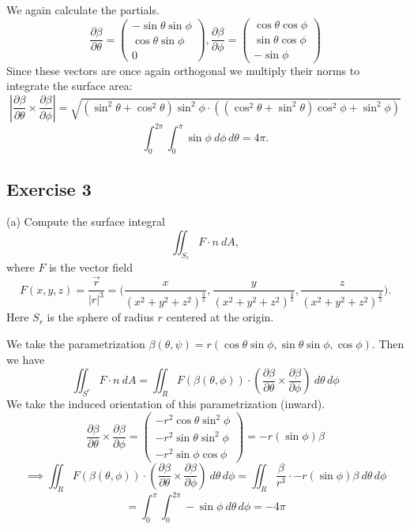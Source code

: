 \documentclass{amsart}
\begin{document}
\medskip \noindent We again calculate the partials.
\[\frac{\partial\beta}{\partial\theta}=\begin{pmatrix}
    -\sin\theta\sin\phi\\
    \cos\theta\sin\phi\\
    0
\end{pmatrix}, \frac{\partial\beta}{\partial\phi}=\begin{pmatrix}
    \cos\theta\cos\phi\\
    \sin\theta\cos\phi\\
    -\sin\phi
\end{pmatrix}\]
Since these vectors are once again orthogonal we multiply their norms to integrate the surface area:
\[\left|\frac{\partial\beta}{\partial\theta}\times \frac{\partial\beta}{\partial\phi}\right|=\sqrt{(\sin^2\theta+\cos^2\theta)
\sin^2\phi\cdot((\cos^2\theta+\sin^2\theta)\cos^2\phi+\sin^2\phi)}\]
\[\int_0^{2\pi}\int_0^{\pi}\sin\phi\:d\phi\,d\theta=4\pi.\]

\bigskip

\subsection*{Exercise 3} (a) Compute the surface integral \[\iint_{S_r}F\cdot n\:dA,\] where $F$ is the vector field
\begin{equation*}
F(x,y,z)=\frac{\vec{r}}{|r|^3}=\bigg(\frac{x}{(x^2+y^2+z^2)^\frac{3}{2}},\frac{y}{(x^2+y^2+z^2)^\frac{3}{2}},\frac{z}{(x^2+y^2+z^2)^\frac{3}{2}}\bigg).
\end{equation*}
Here $S_r$ is the sphere of radius $r$ centered at the origin.

\medskip \noindent We take the parametrization $\beta(\theta, \psi)=r(\cos\theta\sin\phi,\sin\theta\sin\phi,\cos\phi)$. Then we have
\[\iint_{S^r}F\cdot n\:dA=\iint_{R}F(\beta(\theta,\phi))\cdot\left(\frac{\partial\beta}{\partial\theta}\times\frac{\partial\beta}{\partial\phi}\right)\:d\theta\,d\phi\]
We take the induced orientation of this parametrization (inward). 
\[\frac{\partial\beta}{\partial\theta}\times\frac{\partial\beta}{\partial\phi}=\begin{pmatrix}
    -r^2\cos\theta\sin^2\phi\\
    -r^2\sin\theta\sin^2\phi\\
    -r^2\sin\phi\cos\phi
\end{pmatrix}=-r(\sin\phi)\beta\]
\[\implies \iint_{R}F(\beta(\theta,\phi))\cdot\left(\frac{\partial\beta}{\partial\theta}\times\frac{\partial\beta}{\partial\phi}\right)\:d\theta\,d\phi
=\iint_R \frac{\beta}{r^3}\cdot-r(\sin\phi)\beta\:d\theta\,d\phi
\]\[=\int_0^{\pi}\int_0^{2\pi} -\sin\phi \:d\theta\,d\phi=-4\pi\]
\end{document}
